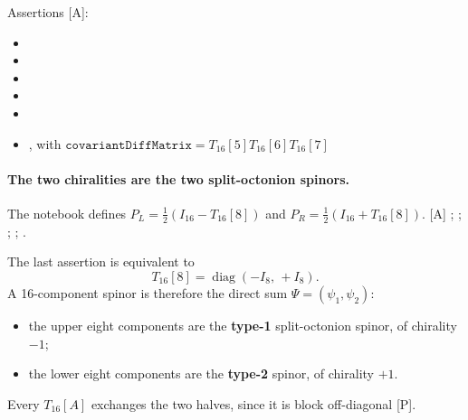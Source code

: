 Assertions [A]:
\begin{itemize}
  \item {}
  \item {}
  \item {}
  \item {}
  \item {}
  \item {}, with
        $\texttt{covariantDiffMatrix}=T_{16}[5]T_{16}[6]T_{16}[7]$
\end{itemize}

\paragraph{The two chiralities are the two split-octonion spinors.} The notebook defines
$P_L=\tfrac12(I_{16}-T_{16}[8])$ and $P_R=\tfrac12(I_{16}+T_{16}[8])$. [A]
; ; ;
;
.

The last assertion is equivalent to
\begin{equation}
  T_{16}[8] = \operatorname{diag}(-I_8,\,+I_8).
\end{equation}
A 16-component spinor is therefore the direct sum $\Psi=(\psi_1,\psi_2)$:
\begin{itemize}
  \item the upper eight components are the \textbf{type-1} split-octonion spinor, of
        chirality $-1$;
  \item the lower eight components are the \textbf{type-2} spinor, of chirality $+1$.
\end{itemize}
Every $T_{16}[A]$ exchanges the two halves, since it is block off-diagonal [P].

